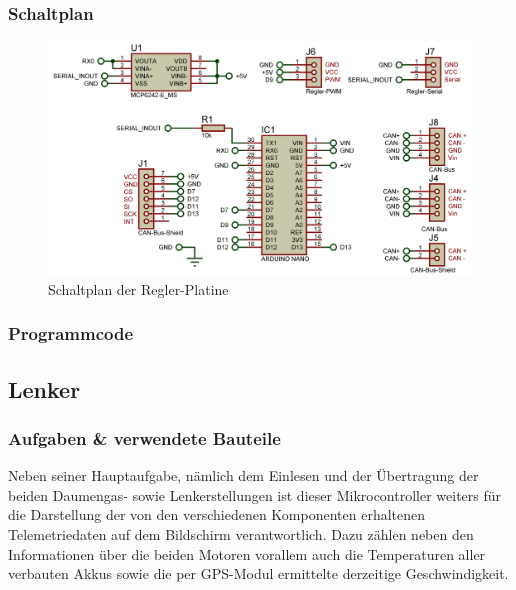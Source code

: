 \subsubsection{Schaltplan}
\begin{figure}[h]
    \centering
    \includegraphics[width=1.0\textwidth]{../Proteus/Exports/Regler-Platine.png}    
    \caption{Schaltplan der Regler-Platine}
\end{figure}

\newpage
\subsubsection{Programmcode}

\newpage
\subsection{Lenker}
\subsubsection{Aufgaben \& verwendete Bauteile}
Neben seiner Hauptaufgabe, nämlich dem Einlesen und der Übertragung der beiden Daumengas- sowie Lenkerstellungen ist dieser Mikrocontroller weiters für die Darstellung der von den verschiedenen Komponenten erhaltenen Telemetriedaten auf dem Bildschirm verantwortlich.
Dazu zählen neben den Informationen über die beiden Motoren vorallem auch die Temperaturen aller verbauten Akkus sowie die per GPS-Modul ermittelte derzeitige Geschwindigkeit.


